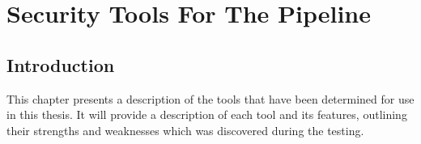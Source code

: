 \chapter{Security Tools For The Pipeline}

\section{Introduction}
This chapter presents a description of the tools that have been determined for use in this thesis. It will provide a description of each tool and its features, outlining their strengths and weaknesses which was discovered during the testing.  



